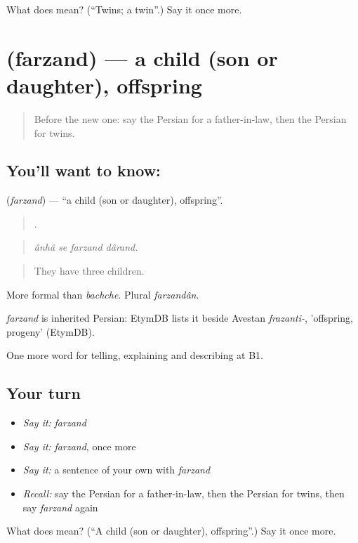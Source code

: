 \begin{tcolorbox}[breakable,colback=teal!4,colframe=teal!35!black,title={Before you move on}]
What does  mean? (\textquotedblleft{}Twins; a twin\textquotedblright{}.) Say it once more.
\end{tcolorbox}
\section[\texorpdfstring{\fa{فرزند} (farzand)}{فرزند (farzand)}]{ (farzand) — a child (son or daughter), offspring}

\label{lesson:FA-C501-farzand}



\begin{quote}
Before the new one: say the Persian for a father-in-law, then the Persian for twins.
\end{quote}

\subsection*{You'll want to know: }
\textbf{} (\emph{farzand}) — \textquotedblleft{}a child (son or daughter), offspring\textquotedblright{}.

\begin{quote}
   .
\end{quote}

\begin{quote}
\emph{ânhâ se farzand dârand.}
\end{quote}

\begin{quote}
They have three children.
\end{quote}

More formal than \emph{bachche}. Plural \emph{farzandân}.

\begin{cousinweb}
\emph{farzand} is inherited Persian: EtymDB lists it beside Avestan \emph{frazanti-}, 'offspring, progeny' (EtymDB).
\end{cousinweb}

\begin{grammarlens}[title={What you've built}]
One more word for telling, explaining and describing at B1.
\end{grammarlens}

\subsection*{Your turn}
\begin{itemize}
\raggedright
  \item \emph{Say it:} \emph{farzand}
  \item \emph{Say it:} \emph{farzand}, once more
  \item \emph{Say it:} a sentence of your own with \emph{farzand}
  \item \emph{Recall:} say the Persian for a father-in-law, then the Persian for twins, then say \emph{farzand} again
\end{itemize}

\begin{tcolorbox}[breakable,colback=teal!4,colframe=teal!35!black,title={Before you move on}]
What does  mean? (\textquotedblleft{}A child (son or daughter), offspring\textquotedblright{}.) Say it once more.
\end{tcolorbox}
